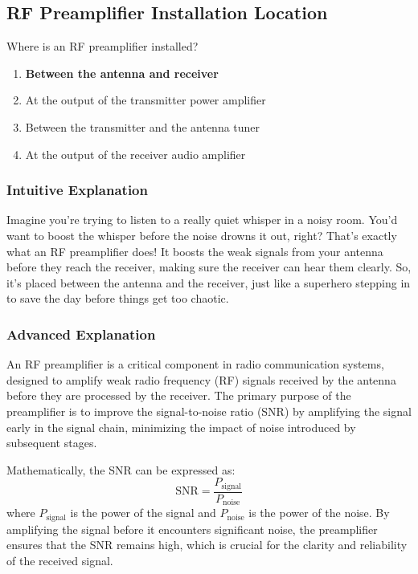 \subsection{RF Preamplifier Installation Location}
\label{T7A11}

\begin{tcolorbox}[colback=gray!10!white,colframe=black!75!black,title=T7A11]
Where is an RF preamplifier installed?
\begin{enumerate}[label=\Alph*)]
    \item \textbf{Between the antenna and receiver}
    \item At the output of the transmitter power amplifier
    \item Between the transmitter and the antenna tuner
    \item At the output of the receiver audio amplifier
\end{enumerate}
\end{tcolorbox}

\subsubsection*{Intuitive Explanation}
Imagine you're trying to listen to a really quiet whisper in a noisy room. You'd want to boost the whisper before the noise drowns it out, right? That's exactly what an RF preamplifier does! It boosts the weak signals from your antenna before they reach the receiver, making sure the receiver can hear them clearly. So, it’s placed between the antenna and the receiver, just like a superhero stepping in to save the day before things get too chaotic.

\subsubsection*{Advanced Explanation}
An RF preamplifier is a critical component in radio communication systems, designed to amplify weak radio frequency (RF) signals received by the antenna before they are processed by the receiver. The primary purpose of the preamplifier is to improve the signal-to-noise ratio (SNR) by amplifying the signal early in the signal chain, minimizing the impact of noise introduced by subsequent stages.

Mathematically, the SNR can be expressed as:
\[
\text{SNR} = \frac{P_{\text{signal}}}{P_{\text{noise}}}
\]
where \(P_{\text{signal}}\) is the power of the signal and \(P_{\text{noise}}\) is the power of the noise. By amplifying the signal before it encounters significant noise, the preamplifier ensures that the SNR remains high, which is crucial for the clarity and reliability of the received signal.

